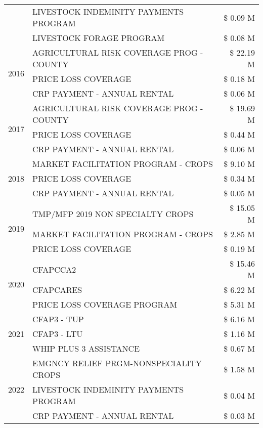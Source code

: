 \begin{tabular}{llr}
 & LIVESTOCK INDEMINITY PAYMENTS PROGRAM & \$ 0.09 M \\
 & LIVESTOCK FORAGE PROGRAM & \$ 0.08 M \\
\cline{1-3}
\multirow[t]{3}{*}{2016} & AGRICULTURAL RISK COVERAGE PROG - COUNTY & \$ 22.19 M \\
 & PRICE LOSS COVERAGE & \$ 0.18 M \\
 & CRP PAYMENT - ANNUAL RENTAL & \$ 0.06 M \\
\cline{1-3}
\multirow[t]{3}{*}{2017} & AGRICULTURAL RISK COVERAGE PROG - COUNTY & \$ 19.69 M \\
 & PRICE LOSS COVERAGE & \$ 0.44 M \\
 & CRP PAYMENT - ANNUAL RENTAL & \$ 0.06 M \\
\cline{1-3}
\multirow[t]{3}{*}{2018} & MARKET FACILITATION PROGRAM - CROPS & \$ 9.10 M \\
 & PRICE LOSS COVERAGE & \$ 0.34 M \\
 & CRP PAYMENT - ANNUAL RENTAL & \$ 0.05 M \\
\cline{1-3}
\multirow[t]{3}{*}{2019} & TMP/MFP 2019 NON SPECIALTY CROPS & \$ 15.05 M \\
 & MARKET FACILITATION PROGRAM - CROPS & \$ 2.85 M \\
 & PRICE LOSS COVERAGE & \$ 0.19 M \\
\cline{1-3}
\multirow[t]{3}{*}{2020} & CFAPCCA2 & \$ 15.46 M \\
 & CFAPCARES & \$ 6.22 M \\
 & PRICE LOSS COVERAGE PROGRAM & \$ 5.31 M \\
\cline{1-3}
\multirow[t]{3}{*}{2021} & CFAP3 - TUP & \$ 6.16 M \\
 & CFAP3 - LTU & \$ 1.16 M \\
 & WHIP PLUS 3 ASSISTANCE & \$ 0.67 M \\
\cline{1-3}
\multirow[t]{3}{*}{2022} & EMGNCY RELIEF PRGM-NONSPECIALITY CROPS & \$ 1.58 M \\
 & LIVESTOCK INDEMINITY PAYMENTS PROGRAM & \$ 0.04 M \\
 & CRP PAYMENT - ANNUAL RENTAL & \$ 0.03 M \\
\cline{1-3}
\bottomrule
\end{tabular}

